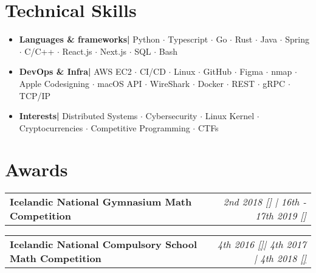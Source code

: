 \documentclass{article}
\makeatletter
\newcommand{\resumeItem}[2]{
  \item{
    \textbf{#1}{\hspace{0.5mm}#2 \vspace{-0.5mm}}
  }
}
\newcommand{\resumeProject}[2]{
\vspace{3mm}
    \begin{tabular*}{0.99\textwidth}[t]{l@{\extracolsep{\fill}}r}
        \textbf{#1} & \textit{\normalsize{#2}}
    \end{tabular*}
    \vspace{-2.5mm}
}
\newcommand{\resumeAward}[2]{
\vspace{3mm}
    \begin{tabular*}{0.99\textwidth}[t]{l@{\extracolsep{\fill}}r}
        \textbf{#1} & \textit{\normalsize{#2}} \\
    \end{tabular*}
    \vspace{-2mm}
}
\newcommand{\resumeSubItem}[2]{\resumeItem{#1}{#2}\vspace{-4pt}}
\newcommand{\resumeSubHeadingListStart}{}
\newcommand{\resumeHeadingSkillStart}{\vspace{4mm}\begin{itemize}[leftmargin=*,itemsep=1mm, rightmargin=2ex]}
\newcommand{\resumeSubHeadingListEnd}{}
\newcommand{\resumeHeadingSkillEnd}{\end{itemize}\vspace{-3mm}}
\makeatother
\begin{document}
\resumeSubHeadingListEnd

\section{\textbf{Technical Skills}}
 \resumeHeadingSkillStart
 \resumeSubItem{Languages \& frameworks| }
    {Python $\cdot$ Typescript $\cdot$ Go $\cdot$ Rust $\cdot$ Java $\cdot$ Spring $\cdot$ C/C++ $\cdot$  React.js $\cdot$ Next.js $\cdot$ SQL $\cdot$ Bash}

	\resumeSubItem{DevOps \& Infra| }
    {AWS EC2 $\cdot$ CI/CD $\cdot$ Linux $\cdot$ GitHub $\cdot$ Figma $\cdot$  nmap $\cdot$ Apple Codesigning $\cdot$ macOS API $\cdot$ WireShark $\cdot$ Docker $\cdot$ REST $\cdot$ gRPC $\cdot$ TCP/IP}

	\resumeSubItem{Interests| }
	{Distributed Systems $\cdot$ Cybersecurity $\cdot$ Linux Kernel $\cdot$ Cryptocurrencies $\cdot$ Competitive Programming $\cdot$ CTFs}
 \resumeHeadingSkillEnd

\section{\textbf{Awards}}
\resumeSubHeadingListStart




\resumeAward
  {Icelandic National Gymnasium Math Competition}
  {2nd 2018 {}[\href{https://www.stae.is/stak/keppnin2018}{\textcolor{black}{\faIcon{globe}}}] | \textit{16th - 17th 2019 {}[\href{https://www.stae.is/stak/keppnin2019}{\textcolor{black}{\faIcon{globe}}}]}}

\resumeAward
	{Icelandic National Compulsory School Math Competition}
	{\textit{4th 2016 \href{http://www.lagafellsskoli.is/forsida/frettir/frett/2016/03/17/Staerdfraedikeppni-grunnskolanna-a-elsta-stigi/}{[\faGlobe]}}| \textit{4th 2017} | \textit{4th 2018 \href{http://www.lagafellsskoli.is/forsida/frettir/frett/2018/04/10/Urslit-staerdfraedikeppni-grunnskolanna-2018/}{[\faGlobe]}}}


\resumeSubHeadingListEnd
\end{document}
